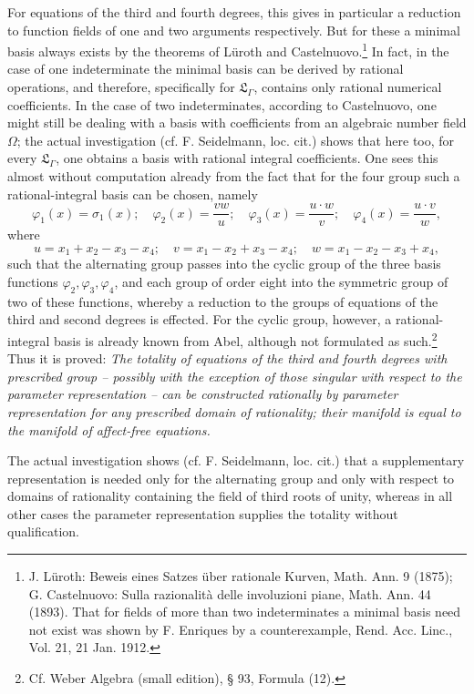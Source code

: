 \documentclass[11pt]{article}
\begin{document}
For equations of the third and fourth degrees, this gives in particular a reduction to function fields of one and two arguments respectively. But for these a minimal basis always exists by the theorems of Lüroth and Castelnuovo.\footnote{J. Lüroth: Beweis eines Satzes über rationale Kurven, Math. Ann. 9 (1875); G. Castelnuovo: Sulla razionalità delle involuzioni piane, Math. Ann. 44 (1893). That for fields of more than two indeterminates a minimal basis need not exist was shown by F. Enriques by a counterexample, Rend. Acc. Linc., Vol. 21, 21 Jan. 1912.} In fact, in the case of one indeterminate the minimal basis can be derived by rational operations, and therefore, specifically for $\mathfrak L_\Gamma$, contains only rational numerical coefficients. In the case of two indeterminates, according to Castelnuovo, one might still be dealing with a basis with coefficients from an algebraic number field $\Omega$; the actual investigation (cf. F. Seidelmann, loc. cit.) shows that here too, for every $\mathfrak L_\Gamma$, one obtains a basis with rational integral coefficients. One sees this almost without computation already from the fact that for the four group such a rational-integral basis can be chosen, namely
\[
\varphi_1(x)=\sigma_1(x);\quad \varphi_2(x)=\frac{v w}{u};\quad \varphi_3(x)=\frac{u\cdot w}{v};\quad \varphi_4(x)=\frac{u\cdot v}{w},
\]
where
\[
u=x_1+x_2-x_3-x_4;\quad v=x_1-x_2+x_3-x_4;\quad w=x_1-x_2-x_3+x_4,
\]
such that the alternating group passes into the cyclic group of the three basis functions $\varphi_2,\varphi_3,\varphi_4$, and each group of order eight into the symmetric group of two of these functions, whereby a reduction to the groups of equations of the third and second degrees is effected. For the cyclic group, however, a rational-integral basis is already known from Abel, although not formulated as such.\footnote{Cf. Weber Algebra (small edition), § 93, Formula (12).} Thus it is proved: \emph{The totality of equations of the third and fourth degrees with prescribed group -- possibly with the exception of those singular with respect to the parameter representation -- can be constructed rationally by parameter representation for any prescribed domain of rationality; their manifold is equal to the manifold of affect-free equations.}

The actual investigation shows (cf. F. Seidelmann, loc. cit.) that a supplementary representation is needed only for the alternating group and only with respect to domains of rationality containing the field of third roots of unity, whereas in all other cases the parameter representation supplies the totality without qualification.
\end{document}
